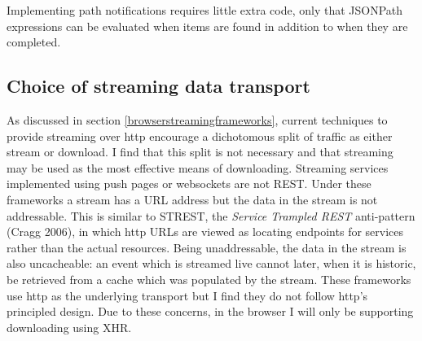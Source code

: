 \documentclass[12pt, ]{article}
\begin{document}
Implementing path notifications requires little extra code, only that
JSONPath expressions can be evaluated when items are found in addition
to when they are completed.

\subsection{Choice of streaming data
transport}\label{choice-of-streaming-data-transport}

As discussed in section \ref{browserstreamingframeworks}, current
techniques to provide streaming over http encourage a dichotomous split
of traffic as either stream or download. I find that this split is not
necessary and that streaming may be used as the most effective means of
downloading. Streaming services implemented using push pages or
websockets are not REST. Under these frameworks a stream has a URL
address but the data in the stream is not addressable. This is similar
to STREST, the \emph{Service Trampled REST} anti-pattern (Cragg 2006),
in which http URLs are viewed as locating endpoints for services rather
than the actual resources. Being unaddressable, the data in the stream
is also uncacheable: an event which is streamed live cannot later, when
it is historic, be retrieved from a cache which was populated by the
stream. These frameworks use http as the underlying transport but I find
they do not follow http's principled design. Due to these concerns, in
the browser I will only be supporting downloading using XHR.
\end{document}
